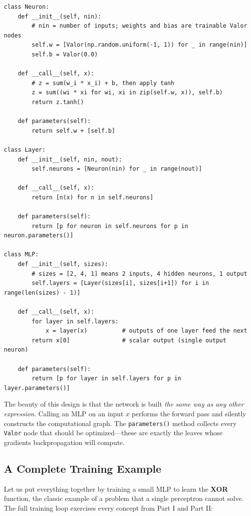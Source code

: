\documentclass{tufte-handout}
\begin{document}
\begin{lstlisting}[caption={A neuron, layer, and MLP built from \texttt{Valor} in \texttt{mini\_nn/network.py}.}]
class Neuron:
    def __init__(self, nin):
        # nin = number of inputs; weights and bias are trainable Valor nodes
        self.w = [Valor(np.random.uniform(-1, 1)) for _ in range(nin)]
        self.b = Valor(0.0)

    def __call__(self, x):
        # z = sum(w_i * x_i) + b, then apply tanh
        z = sum((wi * xi for wi, xi in zip(self.w, x)), self.b)
        return z.tanh()

    def parameters(self):
        return self.w + [self.b]

class Layer:
    def __init__(self, nin, nout):
        self.neurons = [Neuron(nin) for _ in range(nout)]

    def __call__(self, x):
        return [n(x) for n in self.neurons]

    def parameters(self):
        return [p for neuron in self.neurons for p in neuron.parameters()]

class MLP:
    def __init__(self, sizes):
        # sizes = [2, 4, 1] means 2 inputs, 4 hidden neurons, 1 output
        self.layers = [Layer(sizes[i], sizes[i+1]) for i in range(len(sizes) - 1)]

    def __call__(self, x):
        for layer in self.layers:
            x = layer(x)          # outputs of one layer feed the next
        return x[0]               # scalar output (single output neuron)

    def parameters(self):
        return [p for layer in self.layers for p in layer.parameters()]
\end{lstlisting}

The beauty of this design is that the network is built \emph{the same way as any other expression}. Calling an MLP on an input $x$ performs the forward pass and silently constructs the computational graph. The \texttt{parameters()} method collects every \texttt{Valor} node that should be optimized---these are exactly the leaves whose gradients backpropagation will compute.

\subsection{A Complete Training Example}

Let us put everything together by training a small MLP to learn the \textbf{XOR} function, the classic example of a problem that a single perceptron cannot solve. The full training loop exercises every concept from Part I and Part II:
\end{document}
